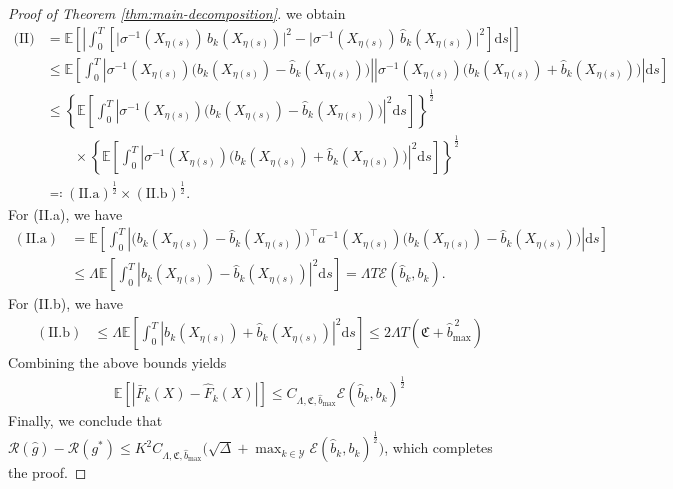 \documentclass{article}
\theoremstyle{plain}
\theoremstyle{definition}
\theoremstyle{remark}
\renewcommand{\d}{\mathrm{d}}
\newcommand{\EE}{\mathbb{E}}
\newcommand{\calY}{\mathcal{Y}}
\newcommand{\calR}{\mathcal{R}}
\newcommand{\calE}{\mathcal{E}}
\newcommand{\rr}{\color{red}}
\newcommand{\black}{\color{black}}
\begin{document}
\begin{proof}[Proof of Theorem \ref{thm:main-decomposition}]
we obtain
\begin{align}\label{eq:II}
\text{(II)} & =    \EE \left[\left|\int_0^T \left[\big\lvert \sigma^{-1} (X_{\eta(s)})\,b_k(X_{\eta(s)}) \big\rvert^2-\big\lvert \sigma^{-1} (X_{\eta(s)})\,\widehat{b}_k(X_{\eta(s)}) \big\rvert^2\right]\d s\right|\right]\nonumber\\
&\leq  \EE \left[\int_{0}^{T} \left| \sigma^{-1} (X_{\eta(s)})\big(b_k(X_{\eta(s)}) -\widehat b_k(X_{\eta(s)}) \big)\right|  \left|\sigma^{-1} (X_{\eta(s)})\big(b_k(X_{\eta(s)}) +\widehat b_k(X_{\eta(s)}) \big)\right|  \d s\right]\nonumber\\
&\leq \left\{ \EE \left[\int_{0}^{T} \left| \sigma^{-1} (X_{\eta(s)})\big(b_k(X_{\eta(s)}) -\widehat b_k(X_{\eta(s)}) \big)\right|^2 \d s \right]\right\}^{\frac{1}{2}}\nonumber\\
&\qquad\times\left\{ \EE \left[\int_{0}^{T} \left| \sigma^{-1} (X_{\eta(s)})\big(b_k(X_{\eta(s)}) +\widehat b_k(X_{\eta(s)}) \big)\right|^2 \d s \right]\right\}^{\frac{1}{2}}\nonumber\\
&\eqqcolon \mathrm{(II.a)}^{\frac{1}{2}}\times \mathrm{(II.b)}^{\frac{1}{2}}.
\end{align}
For (II.a), we have 
\begin{align}\label{eq:II-a}
 \mathrm{(II.a)} & =    \EE \left[\int_{0}^{T} \left| \big(b_k(X_{\eta(s)}) -\widehat b_k(X_{\eta(s)}) \big)^{\top}a^{-1} (X_{\eta(s)})\big(b_k(X_{\eta(s)}) -\widehat b_k(X_{\eta(s)}) \big)\right| \d s \right]\nonumber\\
 &\leq \Lambda \EE \left[\int_{0}^{T} \left| b_k(X_{\eta(s)}) -\widehat b_k(X_{\eta(s)}) \right|^2 \d s\right]   = \Lambda T \calE(\widehat b_k, b_k).
\end{align}
For (II.b), we have 
\begin{align}\label{eq:II-b}
     \mathrm{(II.b)} & \leq \Lambda \EE \left[\int_{0}^{T} \left| b_k(X_{\eta(s)}) +\widehat b_k(X_{\eta(s)}) \right|^2 \d s\right] \leq 2 \Lambda T (\mathfrak{C}+\widehat b_{\max}^{\,2})
\end{align}
Combining the above bounds yields
\begin{align}
    \EE \left[ |\bar F_k(X)-\widehat F_k(X)|\right]\leq C_{\Lambda, \mathfrak{C}, \widehat b_{\max}}\calE(\widehat b_k, b_k)^{\frac{1}{2}}
\end{align}
Finally, we conclude that $\calR(\widehat{g})-\mathcal{R}(g^*)\leq K^2 C_{\Lambda, \mathfrak{C}, \widehat b_{\max}}\big(\sqrt{\Delta} + \max_{k\in\calY}\calE(\widehat b_k, b_k)^{\frac{1}{2}}\big)$, which completes the proof.
\end{proof}
\end{document}
